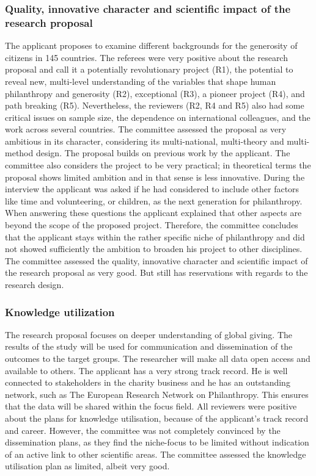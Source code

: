 \documentclass[twocolumn, serif, rga, numeric]{jote-article}
\begin{document}
\subsubsection{\textbf{Quality, innovative character and scientific impact of the research proposal}}
The applicant proposes to examine different backgrounds for the generosity of citizens in 145 countries. The referees were very positive about the research proposal and call it a potentially revolutionary project (R1), the potential to reveal new, multi-level understanding of the variables that shape human philanthropy and generosity (R2), exceptional (R3), a pioneer project (R4), and path breaking (R5). Nevertheless, the reviewers (R2, R4 and R5) also had some critical issues on sample size, the dependence on international colleagues, and the work across several countries. The committee assessed the proposal as very ambitious in its character, considering its multi-national, multi-theory and multi-method design. The proposal builds on previous work by the applicant. The committee also considers the project to be very practical; in theoretical terms the proposal shows limited ambition and in that sense is less innovative. During the interview the applicant was asked if he had considered to include other factors like time and volunteering, or children, as the next generation for philanthropy. When answering these questions the applicant explained that other aspects are beyond the scope of the proposed project. Therefore, the committee concludes that the applicant stays within the rather specific niche of philanthropy and did not showed sufficiently the ambition to broaden his project to other disciplines. The committee assessed the quality, innovative character and scientific impact of the research proposal as very good. But still has reservations with regards to the research design.

\subsubsection{Knowledge utilization}
The research proposal focuses on deeper understanding of global giving. The results of the study will be used for communication and dissemination of the outcomes to the target groups. The researcher will make all data open access and available to others. The applicant has a very strong track record. He is well connected to stakeholders in the charity business and he has an outstanding network, such as The European Research Network on Philanthropy. This ensures that the data will be shared within the focus field. All reviewers were positive about the plans for knowledge utilisation, because of the applicant’s track record and career. However, the committee was not completely convinced by the dissemination plans, as they find the niche-focus to be limited without indication of an active link to other scientific areas. The committee assessed the knowledge utilisation plan as limited, albeit very good.
\end{document}
